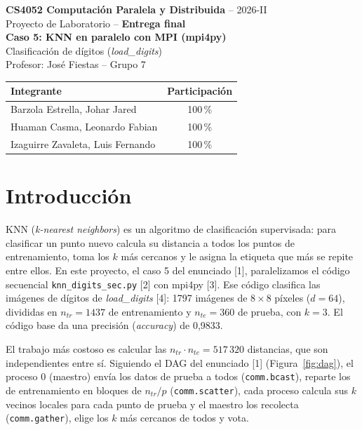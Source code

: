 \documentclass[11pt,a4paper]{article}
\newcommand{\ntr}{n_{tr}}
\newcommand{\nte}{n_{te}}
\begin{document}
\begin{center}
{\large \textbf{CS4052 Computación Paralela y Distribuida} -- 2026-II}\\[2pt]
Proyecto de Laboratorio -- \textbf{Entrega final}\\[10pt]
{\LARGE \textbf{Caso 5: KNN en paralelo con MPI (mpi4py)}}\\[4pt]
{\large Clasificación de dígitos (\textit{load\_digits})}\\[10pt]
Profesor: José Fiestas \quad -- \quad Grupo 7
\end{center}

\begin{table}[h]
\centering
\begin{tabular}{lc}
\toprule
\textbf{Integrante} & \textbf{Participación} \\
\midrule
Barzola Estrella, Johar Jared & 100\,\% \\
Huaman Casma, Leonardo Fabian & 100\,\% \\
Izaguirre Zavaleta, Luis Fernando & 100\,\% \\
\bottomrule
\end{tabular}
\end{table}

\section{Introducción}

KNN (\textit{k-nearest neighbors}) es un algoritmo de clasificación supervisada: para clasificar un punto nuevo calcula su distancia a todos los puntos de entrenamiento, toma los $k$ más cercanos y le asigna la etiqueta que más se repite entre ellos. En este proyecto, el caso 5 del enunciado [1], paralelizamos el código secuencial \texttt{knn\_digits\_sec.py} [2] con mpi4py [3]. Ese código clasifica las imágenes de dígitos de \textit{load\_digits} [4]: 1797 imágenes de $8\times 8$ píxeles ($d = 64$), divididas en $\ntr = 1437$ de entrenamiento y $\nte = 360$ de prueba, con $k = 3$. El código base da una precisión (\textit{accuracy}) de 0,9833.

El trabajo más costoso es calcular las $\ntr\cdot\nte = 517\,320$ distancias, que son independientes entre sí. Siguiendo el DAG del enunciado [1] (Figura~\ref{fig:dag}), el proceso 0 (maestro) envía los datos de prueba a todos (\texttt{comm.bcast}), reparte los de entrenamiento en bloques de $\ntr/p$ (\texttt{comm.scatter}), cada proceso calcula sus $k$ vecinos locales para cada punto de prueba y el maestro los recolecta (\texttt{comm.gather}), elige los $k$ más cercanos de todos y vota.
\end{document}
